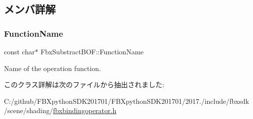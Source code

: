 \subsection{メンバ詳解}
\mbox{\label{class_fbx_substract_b_o_f_a9fc179455ff9204e58db8670b51c44b2}} 
\subsubsection{\texorpdfstring{Function\+Name}{FunctionName}}
{\footnotesize\ttfamily const char$\ast$ Fbx\+Substract\+B\+O\+F\+::\+Function\+Name\hspace{0.3cm}{\ttfamily [static]}}



Name of the operation function. 



このクラス詳解は次のファイルから抽出されました\+:\begin{DoxyCompactItemize}
\item 
C\+:/github/\+F\+B\+Xpython\+S\+D\+K201701/\+F\+B\+Xpython\+S\+D\+K201701/2017./include/fbxsdk/scene/shading/\hyperlink{fbxbindingoperator_8h}{fbxbindingoperator.\+h}\end{DoxyCompactItemize}
